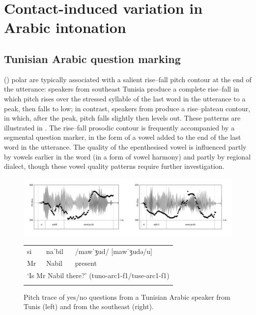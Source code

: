 \documentclass[output=paper]{langsci/langscibook}
\begin{document}
 \section{Contact-induced variation in Arabic intonation} \label{araint}


 \subsection{Tunisian Arabic question marking} \label{tunis}


 () polar  are typically associated with a salient rise--fall pitch contour at the end of the utterance: speakers from southeast Tunisia produce a complete rise--fall in which pitch rises over the stressed syllable of the last word in the utterance to a peak, then falls to low; in contrast, speakers from  produce a rise--plateau contour, in which, after the peak, pitch falls slightly then levels out. These patterns are illustrated in  \citep{BouchhiouaHellmuthAlmbark2019}. The rise--fall prosodic contour is frequently accompanied by a segmental question marker, in the form of a vowel added to the end of the last word in the utterance. The quality of the epenthesised vowel is influenced partly by vowels earlier in the word (in a form of vowel harmony) and partly by regional dialect, though these vowel quality patterns require further investigation.

  
\begin{figure}
\includegraphics[width=\textwidth]{figures/intonation-img1.png}
\caption{\label{fig:key:1}Pitch trace of yes/no questions from a Tunisian Arabic speaker from Tunis (left) and from the southeast (right).}

\begin{tabularx}{\textwidth}{llX}
\lsptoprule
si & naˈbil & /mawˈʒud/ [mawˈʒudə/u]\\
Mr & Nabil & present\\
\multicolumn{3}{l}{‘Is Mr Nabil there?’  (tuno-arc1-f1/tuse-arc1-f1)}\\
\lspbottomrule
\end{tabularx}
\end{figure}
\end{document}
